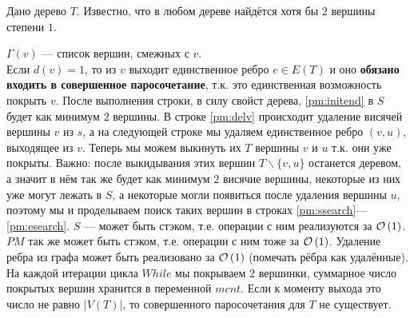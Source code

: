 Дано дерево $T$. Известно, что в любом дереве найдётся хотя бы $2$ вершины степени $1$. 
\begin{algorithmic}[1]
	\EndIf
\EndFor \label{pm:initend}
	 \label{pm:delv}
	 \label{pm:ssearch}
		\EndIf
	\EndFor					\label{pm:esearch}
\EndWhile
{}
\EndIf
{}
\end{algorithmic}
$\Gamma(v)$ --- список вершин, смежных с $v$.\\
Если $d(v) = 1$, то из $v$ выходит единственное ребро $e \in E(T)$ и оно \textbf{обязано входить в совершенное 
паросочетание},
т.к. это единственная возможность покрыть $v$. После выполнения строки, в силу свойст дерева, \ref{pm:initend} в $S$ 
будет как минимум $2$ вершины. В строке \ref{pm:delv} происходит удаление висячей вершины $v$ из $s$, а на следующей 
строке мы удаляем единственное ребро $(v, u)$, выходящее из $v$. Теперь мы можем выкинуть их $T$ вершины $v$ и $u$ т.к.
они уже покрыты. Важно: после выкидывания этих вершин $T\backslash\lbrace v,u \rbrace$ останется деревом, а значит в нём
так же будет как минимум $2$ висячие вершины, некоторые из них уже могут лежать в $S$, а некоторые могли появиться после
удаления вершины $u$, поэтому мы и проделываем поиск таких вершин в строках \ref{pm:ssearch}---\ref{pm:esearch}.
$S$ --- может быть стэком, т.е. операции с ним реализуются за $\mathcal{O}\left(1\right)$. $PM$ так же может быть стэком, т.е. операции
с ним тоже за $\mathcal{O}\left(1\right)$. Удаление ребра из графа может быть реализовано за $\mathcal{O}\left(1\right)$ (помечать рёбра как удалённые).
На каждой итерации цикла $While$ мы покрываем $2$ вершинки, суммарное число покрытых вершин хранится в переменной $mcnt$.
Если к моменту выхода это число не равно $|V(T)|$, то совершенного паросочетания для $T$ не существует.


